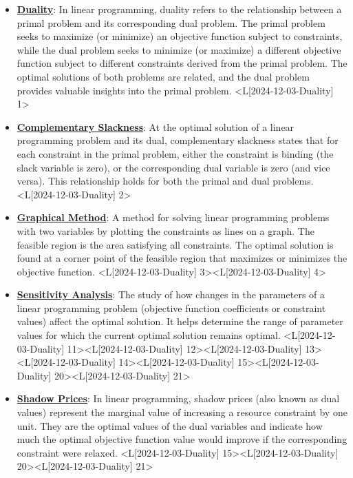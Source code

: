 \documentclass{article}%
\begin{document}
\begin{itemize}[[leftmargin=*]]%
\item \href{https://www.math.purdue.edu/~yipn/421/2024-12-03-Duality.pdf#page=1}{\textbf{Duality}}: In linear programming, duality refers to the relationship between a primal problem and its corresponding dual problem. The primal problem seeks to maximize (or minimize) an objective function subject to constraints, while the dual problem seeks to minimize (or maximize) a different objective function subject to different constraints derived from the primal problem. The optimal solutions of both problems are related, and the dual problem provides valuable insights into the primal problem. <L[2024-12-03-Duality] 1>%
\item \href{https://www.math.purdue.edu/~yipn/421/2024-12-03-Duality.pdf#page=2}{\textbf{Complementary Slackness}}: At the optimal solution of a linear programming problem and its dual, complementary slackness states that for each constraint in the primal problem, either the constraint is binding (the slack variable is zero), or the corresponding dual variable is zero (and vice versa). This relationship holds for both the primal and dual problems. <L[2024-12-03-Duality] 2>%
\item \href{https://www.math.purdue.edu/~yipn/421/2024-12-03-Duality.pdf#page=3}{\textbf{Graphical Method}}: A method for solving linear programming problems with two variables by plotting the constraints as lines on a graph. The feasible region is the area satisfying all constraints. The optimal solution is found at a corner point of the feasible region that maximizes or minimizes the objective function. <L[2024-12-03-Duality] 3><L[2024-12-03-Duality] 4>%
\item \href{https://www.math.purdue.edu/~yipn/421/2024-12-03-Duality.pdf#page=11}{\textbf{Sensitivity Analysis}}: The study of how changes in the parameters of a linear programming problem (objective function coefficients or constraint values) affect the optimal solution. It helps determine the range of parameter values for which the current optimal solution remains optimal. <L[2024-12-03-Duality] 11><L[2024-12-03-Duality] 12><L[2024-12-03-Duality] 13><L[2024-12-03-Duality] 14><L[2024-12-03-Duality] 15><L[2024-12-03-Duality] 20><L[2024-12-03-Duality] 21>%
\item \href{https://www.math.purdue.edu/~yipn/421/2024-12-03-Duality.pdf#page=15}{\textbf{Shadow Prices}}: In linear programming, shadow prices (also known as dual values) represent the marginal value of increasing a resource constraint by one unit. They are the optimal values of the dual variables and indicate how much the optimal objective function value would improve if the corresponding constraint were relaxed. <L[2024-12-03-Duality] 15><L[2024-12-03-Duality] 20><L[2024-12-03-Duality] 21>%
\end{itemize}%
\newpage
\end{document}
